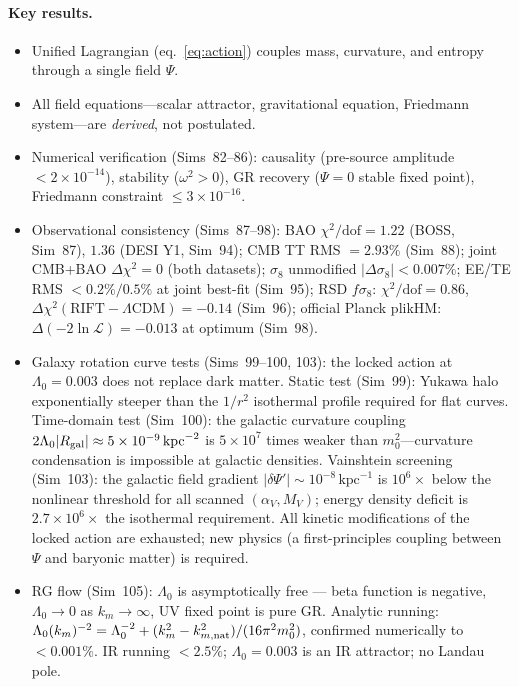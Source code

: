 \documentclass[12pt,a4paper]{article}
\begin{document}
\paragraph{Key results.}
\begin{itemize}
  \item Unified Lagrangian (eq.~\eqref{eq:action}) couples mass, curvature, and entropy through a single field $\Psi$.
  \item All field equations---scalar attractor, gravitational equation, Friedmann system---are \emph{derived}, not postulated.
  \item Numerical verification (Sims~82--86): causality (pre-source amplitude $< 2\times 10^{-14}$), stability ($\omega^2 > 0$), GR recovery ($\Psi = 0$ stable fixed point), Friedmann constraint $\leq 3 \times 10^{-16}$.
  \item Observational consistency (Sims~87--98): BAO $\chi^2/\mathrm{dof} = 1.22$ (BOSS, Sim~87), $1.36$ (DESI Y1, Sim~94); CMB TT RMS $= 2.93\%$ (Sim~88); joint CMB+BAO $\Delta\chi^2 = 0$ (both datasets); $\sigma_8$ unmodified $|\Delta\sigma_8| < 0.007\%$; EE/TE RMS $< 0.2\%/0.5\%$ at joint best-fit (Sim~95); RSD $f\sigma_8$: $\chi^2/\mathrm{dof}=0.86$, $\Delta\chi^2(\mathrm{RIFT}-\Lambda\mathrm{CDM})=-0.14$ (Sim~96); official Planck plikHM: $\Delta(-2\ln\mathcal{L})=-0.013$ at optimum (Sim~98).
  \item Galaxy rotation curve tests (Sims~99--100, 103): the locked action at $\Lambda_0=0.003$ does not replace dark matter.  Static test (Sim~99): Yukawa halo exponentially steeper than the $1/r^2$ isothermal profile required for flat curves.  Time-domain test (Sim~100): the galactic curvature coupling $2\Lambda_0|R_{\rm gal}|\approx5\times10^{-9}\,{\rm kpc}^{-2}$ is $5\times10^7$ times weaker than $m_0^2$---curvature condensation is impossible at galactic densities.  Vainshtein screening (Sim~103): the galactic field gradient $|\delta\Psi'|\sim10^{-8}\,\mathrm{kpc}^{-1}$ is $10^6\times$ below the nonlinear threshold for all scanned $(\alpha_V,M_V)$; energy density deficit is $2.7\times10^6\times$ the isothermal requirement.  All kinetic modifications of the locked action are exhausted; new physics (a first-principles coupling between $\Psi$ and baryonic matter) is required.
  \item RG flow (Sim~105): $\Lambda_0$ is asymptotically free --- beta function is negative, $\Lambda_0\to 0$ as $k_m\to\infty$, UV fixed point is pure GR.  Analytic running: $\Lambda_0(k_m)^{-2} = \Lambda_0^{-2}+(k_m^2-k_{m,\rm nat}^2)/(16\pi^2 m_0^2)$, confirmed numerically to $<0.001\%$.  IR running $<2.5\%$; $\Lambda_0=0.003$ is an IR attractor; no Landau pole.

\end{itemize}
\end{document}

